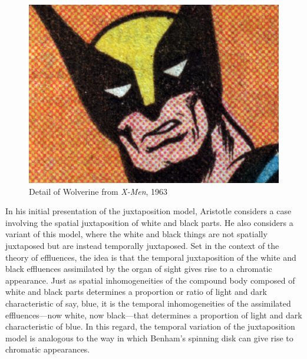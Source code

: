 \begin{figure}[htbp]
    \centering
        \includegraphics[scale=5]{graphics/wolverine.jpg}
    \caption{Detail of Wolverine from \emph{X-Men}, 1963}
    \label{fig:wolverine}
\end{figure}

In his initial presentation of the juxtaposition model, Aristotle considers a case involving the spatial juxtaposition of white and black parts. He also considers a variant of this model, where the white and black things are not spatially juxtaposed but are instead temporally juxtaposed. Set in the context of the theory of effluences, the idea is that the temporal juxtaposition of the white and black effluences assimilated by the organ of sight gives rise to a chromatic appearance. Just as spatial inhomogeneities of the compound body composed of white and black parts determines a proportion or ratio of light and dark characteristic of say, blue, it is the temporal inhomogeneities of the assimilated effluences---now white, now black---that determines a proportion of light and dark characteristic of blue. In this regard, the temporal variation of the juxtaposition model is analogous to the way in which Benham's spinning disk can give rise to chromatic appearances.

